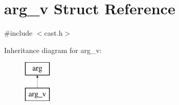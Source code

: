 \hypertarget{structarg__v}{}\section{arg\+\_\+v Struct Reference}
\label{structarg__v}


{\ttfamily \#include $<$cast.\+h$>$}

Inheritance diagram for arg\+\_\+v\+:\begin{figure}[H]
\begin{center}
\leavevmode
\includegraphics[height=2.000000cm]{structarg__v}
\end{center}
\end{figure}
